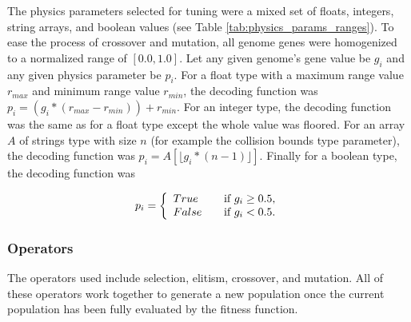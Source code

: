 The physics parameters selected for tuning were a mixed set of floats, integers, string arrays, and boolean values (see Table \ref{tab:physics_params_ranges}). To ease the process of crossover and mutation, all genome genes were homogenized to a normalized range of $[0.0,1.0]$. Let any given genome's gene value be $g_i$ and any given physics parameter be $p_i$. For a float type with a maximum range value $r_{max}$ and minimum range value $r_{min}$, the decoding function was $p_i=(g_i*(r_{max}-r_{min}))+r_{min}$. For an integer type, the decoding function was the same as for a float type except the whole value was floored. For an array $A$ of strings type with size $n$ (for example the collision bounds type parameter), the decoding function was $p_i=A[\lfloor g_i*(n-1)\rfloor]$. Finally for a boolean type, the decoding function was 

\[ p_i = \left\{
\begin{array}{l l}
True & \quad \text{if $g_i\geq 0.5$,}\\
False & \quad \text{if $g_i < 0.5$.}
\end{array} 
\right.\]

\subsubsection{Operators}

The operators used include selection, elitism, crossover, and mutation. All of these operators work together to generate a new population once the current population has been fully evaluated by the fitness function.

